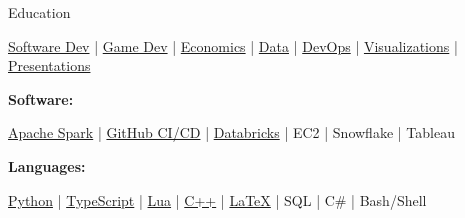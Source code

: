 \documentclass{resume/resume}
\begin{document}
\begin{rSection}{Education}
\begin{adjustwidth}{6em}{0pt}
  \href{https://spelkington.github.io/categories/#Software}{Software Dev} |
  \href{https://spelkington.github.io/categories/#Games}{Game Dev} |
  \href{https://spelkington.github.io/categories/#Economics}{Economics} |
  \href{https://spelkington.github.io/categories/#Data}{Data} | 
  \href{https://spelkington.github.io/categories/#DevOps}{DevOps} |
  \href{https://spelkington.github.io/categories/#Viz}{Visualizations} |
  \href{https://spelkington.github.io/categories/#Presentation}{Presentations}
  
\end{adjustwidth}


%
%
%
\vspace{-3pt}
{\bf Software:}
\vspace{-1.83em}
\begin{adjustwidth}{6em}{0pt}
  \href{https://spelkington.github.io/categories/#Spark}{Apache Spark} | 
  \href{https://spelkington.github.io/categories/#GitHub}{GitHub CI/CD} | 
  \href{https://spelkington.github.io/categories/#Databricks}{Databricks} | 
  EC2 | 
  Snowflake | 
  Tableau

\end{adjustwidth}

\end{rSection}

%
%   
%
%
%
\vspace{-0.4em}
{\bf Languages:}
\vspace{-1.83em}
\begin{adjustwidth}{6em}{0pt}
  \href{https://spelkington.github.io/categories/#Python}{Python} |
  \href{https://spelkington.github.io/categories/#TypeScript}{TypeScript} | 
  \href{https://spelkington.github.io/categories/#Lua}{Lua} | 
  \href{https://spelkington.github.io/categories/#C++}{C++} |
  \href{https://spelkington.github.io/categories/#LaTeX}{LaTeX} |
  SQL |
  C\# |
  Bash/Shell
\end{adjustwidth}
\end{document}
